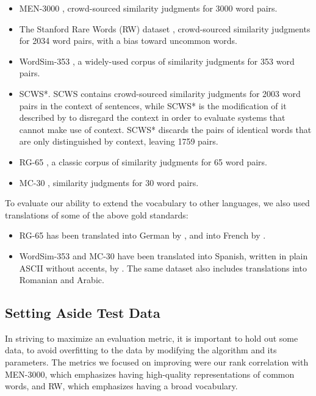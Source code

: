 \documentclass[11pt]{article}
\begin{document}
\begin{itemize}
\item MEN-3000 \cite{bruni2014men}, crowd-sourced similarity judgments for 3000
    word pairs.
\item The Stanford Rare Words (RW) dataset \cite{luong2013rw}, crowd-sourced
    similarity judgments for 2034 word pairs, with a bias toward uncommon words.
\item WordSim-353 \cite{finkelstein2001ws}, a widely-used corpus of similarity
    judgments for 353 word pairs.
\item SCWS*. SCWS \cite{huang2012scws} contains crowd-sourced similarity
    judgments for 2003 word pairs in the context of sentences, while SCWS* is
    the modification of it described by 
    to disregard the context in order to evaluate
    systems that cannot make use of context. SCWS* discards the pairs of
    identical words that are only distinguished by context, leaving 1759 pairs.
\item RG-65 \cite{rubenstein1965rg}, a classic corpus of similarity judgments
    for 65 word pairs.
\item MC-30 \cite{miller1991mc}, similarity judgments for 30 word pairs.
\end{itemize}

To evaluate our ability to extend the vocabulary to other languages, we also
used translations of some of the above gold standards:

\begin{itemize}
\item RG-65 has been translated into German by ,
    and into French by .
\item WordSim-353 and MC-30 have been translated into Spanish, written in
    plain ASCII without accents, by . The
    same dataset also includes translations into Romanian and Arabic.
\end{itemize}

\subsection{Setting Aside Test Data}

In striving to maximize an evaluation metric, it is important to hold out some
data, to avoid overfitting to the data by modifying the algorithm and its
parameters. The metrics we focused on improving were our rank correlation with
MEN-3000, which emphasizes having high-quality representations of common words,
and RW, which emphasizes having a broad vocabulary.
\end{document}
